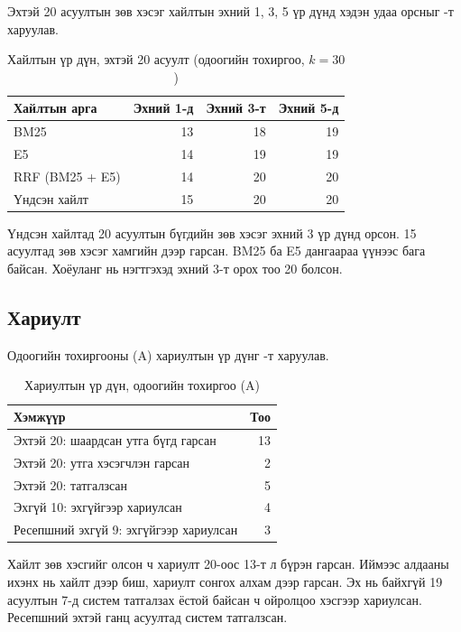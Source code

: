 Эхтэй 20 асуултын зөв хэсэг хайлтын эхний 1, 3, 5 үр дүнд хэдэн удаа орсныг -т харуулав.

\begin{table}[H]
\centering
\caption{Хайлтын үр дүн, эхтэй 20 асуулт (одоогийн тохиргоо, $k=30$)}
\label{tab:rag_retrieval}
\begin{tabular}{|l|r|r|r|}
\hline
\textbf{Хайлтын арга} & \textbf{Эхний 1-д} & \textbf{Эхний 3-т} & \textbf{Эхний 5-д} \\
\hline
BM25 & 13 & 18 & 19 \\
E5 & 14 & 19 & 19 \\
RRF (BM25 + E5) & 14 & 20 & 20 \\
Үндсэн хайлт & 15 & 20 & 20 \\
\hline
\end{tabular}
\end{table}

Үндсэн хайлтад 20 асуултын бүгдийн зөв хэсэг эхний 3 үр дүнд орсон. 15 асуултад зөв хэсэг хамгийн дээр гарсан. BM25 ба E5 дангаараа үүнээс бага байсан. Хоёуланг нь нэгтгэхэд эхний 3-т орох тоо 20 болсон.

\subsection{Хариулт}
\label{sec:res-answers}

Одоогийн тохиргооны (A) хариултын үр дүнг -т харуулав.

\begin{table}[H]
\centering
\caption{Хариултын үр дүн, одоогийн тохиргоо (A)}
\label{tab:rag_answers}
\begin{tabular}{|p{8.0cm}|r|}
\hline
\textbf{Хэмжүүр} & \textbf{Тоо} \\
\hline
Эхтэй 20: шаардсан утга бүгд гарсан & 13 \\
Эхтэй 20: утга хэсэгчлэн гарсан & 2 \\
Эхтэй 20: татгалзсан & 5 \\
\hline
Эхгүй 10: эхгүйгээр хариулсан & 4 \\
Ресепшний эхгүй 9: эхгүйгээр хариулсан & 3 \\
\hline
\end{tabular}
\end{table}

Хайлт зөв хэсгийг олсон ч хариулт 20-оос 13-т л бүрэн гарсан. Иймээс алдааны ихэнх нь хайлт дээр биш, хариулт сонгох алхам дээр гарсан. Эх нь байхгүй 19 асуултын 7-д систем татгалзах ёстой байсан ч ойролцоо хэсгээр хариулсан. Ресепшний эхтэй ганц асуултад систем татгалзсан.

